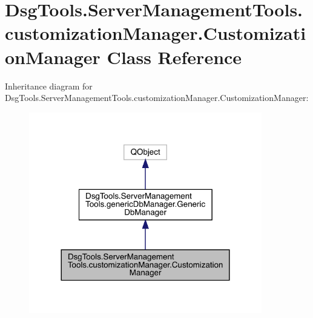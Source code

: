 \hypertarget{class_dsg_tools_1_1_server_management_tools_1_1customization_manager_1_1_customization_manager}{}\section{Dsg\+Tools.\+Server\+Management\+Tools.\+customization\+Manager.\+Customization\+Manager Class Reference}
\label{class_dsg_tools_1_1_server_management_tools_1_1customization_manager_1_1_customization_manager}


Inheritance diagram for Dsg\+Tools.\+Server\+Management\+Tools.\+customization\+Manager.\+Customization\+Manager\+:
\nopagebreak
\begin{figure}[H]
\begin{center}
\leavevmode
\includegraphics[width=288pt]{class_dsg_tools_1_1_server_management_tools_1_1customization_manager_1_1_customization_manager__inherit__graph}
\end{center}
\end{figure}


